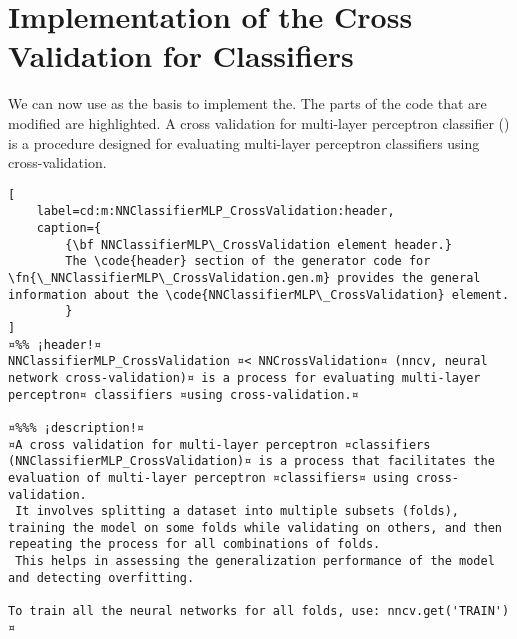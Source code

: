\documentclass{tufte-handout}
\begin{document}
\clearpage
\section{Implementation of the Cross Validation for Classifiers}

We can now use  as the basis to implement the. The parts of the code that are modified are highlighted.
A cross validation for multi-layer perceptron classifier () is a procedure designed for evaluating multi-layer perceptron classifiers using cross-validation. 

\begin{lstlisting}[
	label=cd:m:NNClassifierMLP_CrossValidation:header,
	caption={
		{\bf NNClassifierMLP\_CrossValidation element header.}
		The \code{header} section of the generator code for \fn{\_NNClassifierMLP\_CrossValidation.gen.m} provides the general information about the \code{NNClassifierMLP\_CrossValidation} element.
		}
]
¤%% ¡header!¤
NNClassifierMLP_CrossValidation ¤< NNCrossValidation¤ (nncv, neural network cross-validation)¤ is a process for evaluating multi-layer perceptron¤ classifiers ¤using cross-validation.¤

¤%%% ¡description!¤
¤A cross validation for multi-layer perceptron ¤classifiers (NNClassifierMLP_CrossValidation)¤ is a process that facilitates the evaluation of multi-layer perceptron ¤classifiers¤ using cross-validation. 
 It involves splitting a dataset into multiple subsets (folds), training the model on some folds while validating on others, and then repeating the process for all combinations of folds. 
 This helps in assessing the generalization performance of the model and detecting overfitting.

To train all the neural networks for all folds, use: nncv.get('TRAIN')¤

\end{lstlisting}
\end{document}
